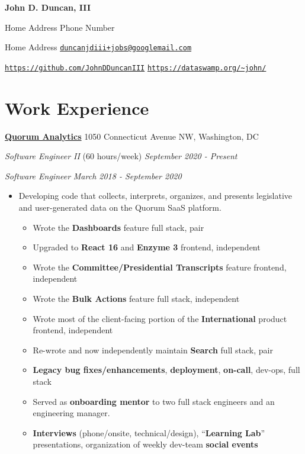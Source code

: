 \documentclass[11pt]{article}
\begin{document}
\fancyfoot{}
\pagestyle{fancy}
\thispagestyle{empty}
\renewcommand{\headrulewidth}{0pt}
\renewcommand{\footrulewidth}{0pt}

\begin{center}
	{\huge \textbf{John D. Duncan, III}}
\end{center}
Home Address
\hfill
Phone Number

Home Address
\hfill
\texttt{\href{mailto:duncanjdiii+jobs@googlemail.com}{duncanjdiii+jobs@googlemail.com}}

\texttt{\url{https://github.com/JohnDDuncanIII}}
\hfill
\texttt{\url{https://dataswamp.org/~john/}}

\section*{Work Experience}
\textbf{\href{https://www.quorum.us/}{Quorum Analytics}}
\hfill
1050 Connecticut Avenue NW, Washington, DC

\textit{Software Engineer II} {\small (60 hours/week)}
\hfill
\textit{September 2020 - Present}
\hfill

\textit{Software Engineer}
\hfill
\textit{March 2018 - September 2020}
\hfill

\begin{itemize}
	\item Developing code that collects, interprets, organizes, and 
presents legislative and user-generated data on the Quorum SaaS platform.
	\begin{itemize}[noitemsep]
		\item Wrote the \textbf{Dashboards} feature \hfill full stack, pair
		\item Upgraded to \textbf{React 16} and \textbf{Enzyme 3} \hfill frontend, independent
		\item Wrote the \textbf{Committee/Presidential Transcripts} feature \hfill frontend, independent
		\item Wrote the \textbf{Bulk Actions} feature \hfill full stack, independent
		\item Wrote most of the client-facing portion of the \textbf{International} product \hfill frontend, independent
		\item Re-wrote and now independently maintain \textbf{Search} \hfill full stack, pair
		\item \textbf{Legacy bug fixes/enhancements}, \textbf{deployment}, \textbf{on-call}, dev-ops, \hfill full stack
		\item Served as \textbf{onboarding mentor} to two full stack engineers and an engineering manager.
		\item \textbf{Interviews} (phone/onsite, technical/design), ``\textbf{Learning Lab}'' presentations, organization of weekly dev-team \textbf{social events}
	\end{itemize}
\end{itemize}
\end{document}
